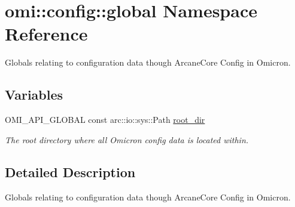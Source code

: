 \hypertarget{namespaceomi_1_1config_1_1global}{}\section{omi\+:\+:config\+:\+:global Namespace Reference}
\label{namespaceomi_1_1config_1_1global}


Globals relating to configuration data though Arcane\+Core Config in Omicron.  


\subsection*{Variables}
\begin{DoxyCompactItemize}
\item 
O\+M\+I\+\_\+\+A\+P\+I\+\_\+\+G\+L\+O\+B\+AL const arc\+::io\+::sys\+::\+Path \hyperlink{namespaceomi_1_1config_1_1global_a08c648c90660a7f22c9a1d4bc19b517d}{root\+\_\+dir}\hypertarget{namespaceomi_1_1config_1_1global_a08c648c90660a7f22c9a1d4bc19b517d}{}\label{namespaceomi_1_1config_1_1global_a08c648c90660a7f22c9a1d4bc19b517d}

\begin{DoxyCompactList}\small\item\em The root directory where all Omicron config data is located within. \end{DoxyCompactList}\end{DoxyCompactItemize}


\subsection{Detailed Description}
Globals relating to configuration data though Arcane\+Core Config in Omicron. 